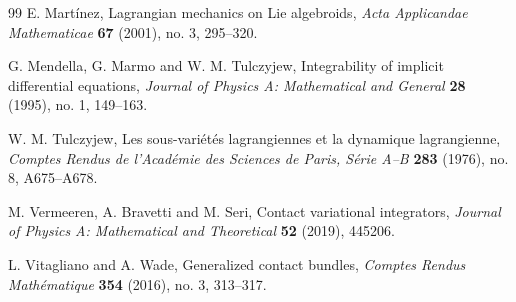 \documentclass[11pt]{article}
\begin{document}
\begin{thebibliography}{99}
E. Mart\'inez,
Lagrangian mechanics on Lie algebroids,
\textit{Acta Applicandae Mathematicae}
\textbf{67} (2001), no. 3, 295--320.

G. Mendella, G. Marmo and W. M. Tulczyjew,
Integrability of implicit differential equations,
\textit{Journal of Physics A: Mathematical and General}
\textbf{28} (1995), no. 1, 149--163.

W. M. Tulczyjew,
Les sous-vari\'et\'es lagrangiennes et la dynamique lagrangienne,
\textit{Comptes Rendus de l'Acad\'emie des Sciences de Paris, S\'erie A--B}
\textbf{283} (1976), no. 8, A675--A678.

M. Vermeeren, A. Bravetti and M. Seri,
Contact variational integrators,
\textit{Journal of Physics A: Mathematical and Theoretical}
\textbf{52} (2019), 445206.

L. Vitagliano and A. Wade,
Generalized contact bundles,
\textit{Comptes Rendus Math\'ematique}
\textbf{354} (2016), no. 3, 313--317.


\end{thebibliography}
\end{document}
